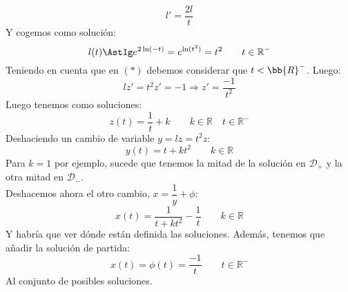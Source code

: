 \begin{ejemplo}
\begin{equation*}
        l' = \dfrac{2l}{t}
    \end{equation*}
    Y cogemos como solución:
    \begin{equation*}
        l(t) \AstIg e^{2\ln(-t)} = e^{\ln(t^2)} = t^2 \qquad t\in \mathbb{R}^-
    \end{equation*}
    Teniendo en cuenta que en $(\ast)$ debemos considerar que $t<\bb{R}^-$. Luego:
    \begin{equation*}
        lz' = t^2 z' = -1 \Longrightarrow z' = \dfrac{-1}{t^2}
    \end{equation*}
    Luego tenemos como soluciones:
    \begin{equation*}
        z(t) = \dfrac{1}{t} + k \qquad k\in \mathbb{R} \quad t\in \mathbb{R}^-
    \end{equation*}
    Deshaciendo un cambio de variable $y=lz = t^2 z$:
    \begin{equation*}
        y(t) = t + kt^2 \qquad k\in \mathbb{R} 
    \end{equation*}
    Para $k=1$ por ejemplo, sucede que tenemos la mitad de la solución en $\mathcal{D}_+$ y la otra mitad en $\mathcal{D}_-$.\\
    Deshacemos ahora el otro cambio, $x=\dfrac{1}{y}+\phi$:
    \begin{equation*}
        x(t) = \dfrac{1}{t+kt^2} - \dfrac{1}{t} \qquad k\in \mathbb{R}
    \end{equation*}
    Y habría que ver dónde están definida las soluciones. Además, tenemos que añadir la solución de partida:
    \begin{equation*}
        x(t) = \phi(t) = \dfrac{-1}{t}\qquad t\in \mathbb{R}^-
    \end{equation*}
    Al conjunto de posibles soluciones.
\end{ejemplo}

